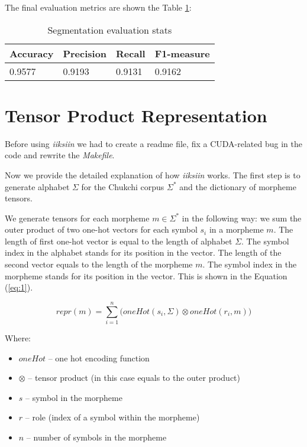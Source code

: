\documentclass[leqno]{article}
\begin{document}
The final evaluation metrics are shown the Table \ref{tab:segmmetrics}: 
\begin{table}[h]
\centering
\begin{tabular}{|l|l|l|l|}
\hline
Accuracy & Precision & Recall & F1-measure \\ \hline
0.9577   & 0.9193    & 0.9131 & 0.9162     \\ \hline
\end{tabular}
\caption{Segmentation evaluation stats}
\label{tab:segmmetrics}
\end{table}

\section{Tensor Product Representation}

Before using \emph{iiksiin} we had to create a readme file,
fix a CUDA-related bug in the code and
rewrite the \textit{Makefile}.

Now we provide the detailed explanation of how \textit{iiksiin} works. The first step is to generate alphabet $\Sigma$ for the Chukchi corpus $\Sigma^{*}$ and the dictionary of morpheme tensors.

We generate tensors for each morpheme $m \in \Sigma^*$ in the following way:
we sum the outer product of two one-hot vectors for each symbol $s_i$
in a morpheme $m$. The length of first one-hot vector is equal to
the length of alphabet $\Sigma$. The symbol index in the alphabet stands
for its position in the vector. The length of the second vector equals
to the length of the morpheme $m$. The symbol index in the morpheme stands
for its position in the vector. This is shown in the
Equation (\ref{eq:1}).

\begin{equation}\label{eq:1}
    repr(m) = \sum_{i=1}^{n}
    \bigg(oneHot(s_i, \Sigma) \otimes oneHot(r_i, m)\bigg)
\end{equation}

Where:

\begin{itemize}
    \item $oneHot$ -- one hot encoding function
    \item $\otimes$ -- tensor product (in this case equals to the outer product) 
    \item $s$ -- symbol in the morpheme
    \item $r$ -- role (index of a symbol within the morpheme)
    \item $n$ -- number of symbols in the morpheme
\end{itemize}
\end{document}
